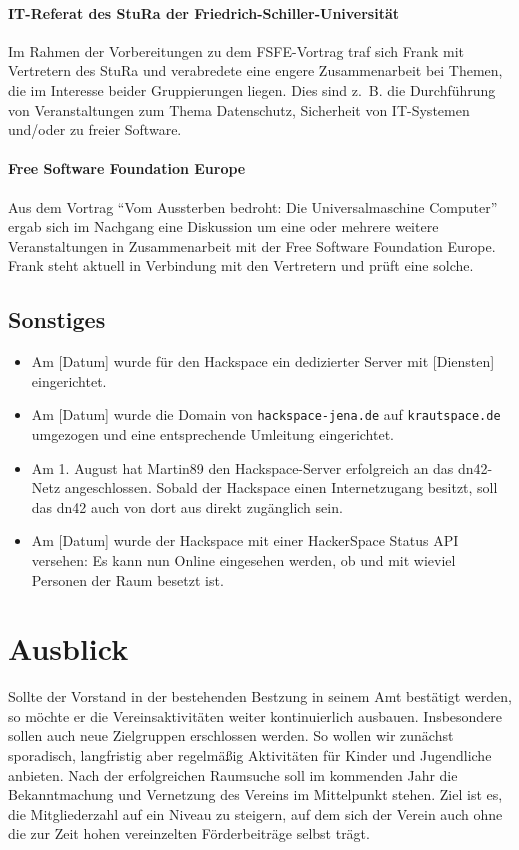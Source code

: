 \documentclass[10pt,DIV16]{scrartcl}
\begin{document}
\paragraph{IT-Referat des StuRa der Friedrich-Schiller-Universität}

Im Rahmen der Vorbereitungen zu dem FSFE-Vortrag traf sich Frank mit
Vertretern des StuRa und verabredete eine engere Zusammenarbeit bei
Themen, die im Interesse beider Gruppierungen liegen. Dies sind z.\,
B. die Durchführung von Veranstaltungen zum Thema Datenschutz,
Sicherheit von IT-Systemen und/oder zu freier Software.

\paragraph{Free Software Foundation Europe}

Aus dem Vortrag "`Vom Aussterben bedroht: Die Universalmaschine
Computer"' ergab sich im Nachgang eine Diskussion um eine oder
mehrere weitere Veranstaltungen in Zusammenarbeit mit der Free
Software Foundation Europe. Frank steht aktuell in Verbindung mit
den Vertretern und prüft eine solche.

\subsection{Sonstiges}

\begin{itemize}
	\item
		Am [Datum] wurde für den Hackspace ein dedizierter Server mit
		[Diensten] eingerichtet.
	\item
		Am [Datum] wurde die Domain von \texttt{hackspace-jena.de} auf
		\texttt{krautspace.de} umgezogen und eine entsprechende Umleitung
		eingerichtet.
	\item
		Am 1. August hat Martin89 den Hackspace-Server erfolgreich an das
		dn42-Netz angeschlossen.  Sobald der Hackspace einen Internetzugang
		besitzt, soll das dn42 auch von dort aus direkt zugänglich sein.
	\item
		Am [Datum] wurde der Hackspace mit einer HackerSpace Status API
		versehen:  Es kann nun Online eingesehen werden, ob und mit wieviel
		Personen der Raum besetzt ist.
\end{itemize}

\section{Ausblick}

Sollte der Vorstand in der bestehenden Bestzung in seinem Amt bestätigt
werden, so möchte er die Vereinsaktivitäten weiter kontinuierlich ausbauen.
Insbesondere sollen auch neue Zielgruppen erschlossen werden.  So wollen wir
zunächst sporadisch, langfristig aber regelmäßig Aktivitäten für Kinder und
Jugendliche anbieten.  Nach der erfolgreichen Raumsuche soll im kommenden Jahr
die Bekanntmachung und Vernetzung des Vereins im Mittelpunkt stehen.  Ziel ist
es, die Mitgliederzahl auf ein Niveau zu steigern, auf dem sich der Verein
auch ohne die zur Zeit hohen vereinzelten Förderbeiträge selbst trägt.
\end{document}
